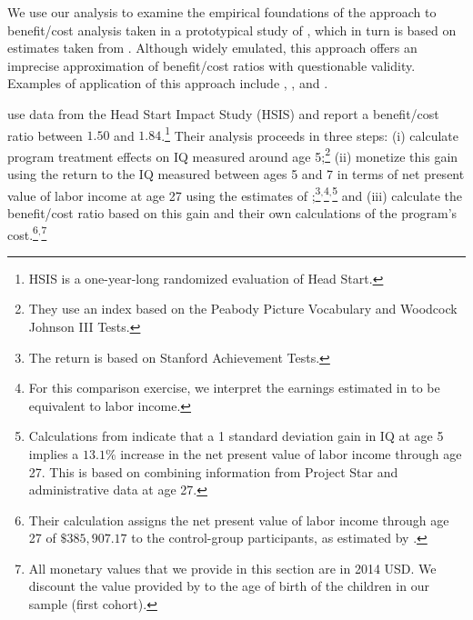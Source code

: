 We use our analysis to examine the empirical foundations of the approach to benefit/cost analysis taken in a prototypical study of \citet{Kline_Walters_2016_QJE}, which in turn is based on estimates taken from \citet{Chetty_Friedman_etal_2011_QJoE}. Although widely emulated, this approach offers an imprecise approximation of benefit/cost ratios with questionable validity. Examples of application of this approach include \citet{Attanasio_Kugler_Meghir_2011_AEJAE}, \cite{Behrman-et-al_2011_JHR-Progresa}, and \cite{Lafortune_etal_2018_Reform_AEJAE}.

\citet{Kline_Walters_2016_QJE} use data from the Head Start Impact Study (HSIS) and report a benefit/cost ratio between $1.50$ and $1.84$.\footnote{HSIS is a one-year-long randomized evaluation of Head Start.} Their analysis proceeds in three steps: (i) calculate program treatment effects on IQ measured around age 5;\footnote{They use an index based on the Peabody Picture Vocabulary and Woodcock Johnson III Tests.} (ii) monetize this gain using the return to the IQ measured between ages 5 and 7 in terms of net present value of labor income at age 27 using the estimates of \citet{Chetty_Friedman_etal_2011_QJoE};\footnote{The \citet{Chetty_Friedman_etal_2011_QJoE} return is based on Stanford Achievement Tests.}$^,$\footnote{For this comparison exercise, we interpret the earnings estimated in \citet{Chetty_Friedman_etal_2011_QJoE} to be equivalent to labor income.}$^,$\footnote{Calculations from \citet{Chetty_Friedman_etal_2011_QJoE} indicate that a 1 standard deviation gain in IQ at age 5 implies a $13.1\%$ increase in the net present value of labor income through age 27. This is based on combining information from Project Star and administrative data at age 27.} and (iii) calculate the benefit/cost ratio based on this gain and their own calculations of the program's cost.\footnote{Their calculation assigns the net present value of labor income through age 27 of $\$385,907.17$ to the control-group participants, as estimated by  \citet{Chetty_Friedman_etal_2011_QJoE}.}$^,$\footnote{All monetary values that we provide in this section are in 2014 USD. We discount the value provided by \citet{Chetty_Friedman_etal_2011_QJoE} to the age of birth of the children in our sample (first cohort).}

